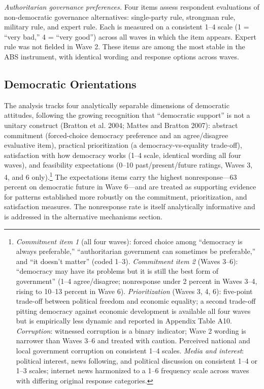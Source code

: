 \documentclass[
  12pt,
  letterpaper]{article}
\begin{document}
\emph{Authoritarian governance preferences.} Four items assess
respondent evaluations of non-democratic governance alternatives:
single-party rule, strongman rule, military rule, and expert rule. Each
is measured on a consistent 1--4 scale (1 = ``very bad,'' 4 = ``very
good'') across all waves in which the item appears. Expert rule was not
fielded in Wave 2. These items are among the most stable in the ABS
instrument, with identical wording and response options across waves.

\subsection{Democratic Orientations}\label{democratic-orientations}

The analysis tracks four analytically separable dimensions of democratic
attitudes, following the growing recognition that ``democratic support''
is not a unitary construct (Bratton et al. 2004; Mattes and Bratton
2007): abstract commitment (forced-choice democracy preference and an
agree/disagree evaluative item), practical prioritization (a
democracy-vs-equality trade-off), satisfaction with how democracy works
(1--4 scale, identical wording all four waves), and feasibility
expectations (0--10 past/present/future ratings, Waves 3, 4, and 6
only).\footnote{\emph{Commitment item 1} (all four waves): forced choice
  among ``democracy is always preferable,'' ``authoritarian government
  can sometimes be preferable,'' and ``it doesn't matter'' (coded 1--3).
  \emph{Commitment item 2} (Waves 3--6): ``democracy may have its
  problems but it is still the best form of government'' (1--4
  agree/disagree; nonresponse under 2 percent in Waves 3--4, rising to
  10--13 percent in Wave 6). \emph{Prioritization} (Waves 3, 4, 6):
  five-point trade-off between political freedom and economic equality;
  a second trade-off pitting democracy against economic development is
  available all four waves but is empirically less dynamic and reported
  in Appendix Table A10. \emph{Corruption}: witnessed corruption is a
  binary indicator; Wave 2 wording is narrower than Waves 3--6 and
  treated with caution. Perceived national and local government
  corruption on consistent 1--4 scales. \emph{Media and interest}:
  political interest, news following, and political discussion on
  consistent 1--4 or 1--3 scales; internet news harmonized to a 1--6
  frequency scale across waves with differing original response
  categories.} The expectations items carry the highest nonresponse---63
percent on democratic future in Wave 6---and are treated as supporting
evidence for patterns established more robustly on the commitment,
prioritization, and satisfaction measures. The nonresponse rate is
itself analytically informative and is addressed in the alternative
mechanisms section.
\end{document}
